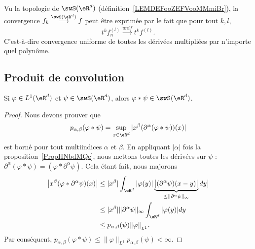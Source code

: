 \begin{remark}
    Vu la topologie de \( \swS(\eR^d)\) (définition~\ref{LEMDEFooZEFVooMMmiBr}), la convergence \( f_k\stackrel{\swS(\eR^d)}{\longrightarrow}f\) peut être exprimée par le fait que pour tout \( k,l\),
    \begin{equation}
        t^kf_n^{(l)}\stackrel{unif}{\longrightarrow}t^kf^{(l)}.
    \end{equation}
    C'est-à-dire convergence uniforme de toutes les dérivées multipliées par n'importe quel polynôme.
\end{remark}

\subsection{Produit de convolution}

\begin{proposition}     \label{PROPooUNFYooYdbSbJ}
    Si \( \varphi\in L^1(\eR^d)\) et \( \psi\in\swS(\eR^d)\), alors \( \varphi * \psi\in \swS(\eR^d)\).
\end{proposition}

\begin{proof}
    Nous devons prouver que
    \begin{equation}
        p_{\alpha,\beta}(\varphi*\psi)=\sup_{x\in \eR^d}| x^{\beta}(\partial^{\alpha}(\varphi*\psi))(x) |
    \end{equation}
    est borné pour tout multiindices \( \alpha\) et \( \beta\). En appliquant \( | \alpha |\) fois la proposition~\ref{PropHNbdMQe}, nous mettons toutes les dérivées sur \( \psi\) : \( \partial^{\alpha}(\varphi*\psi)=(\varphi*\partial^{\alpha}\psi)\). Cela étant fait, nous majorons
    \begin{subequations}
        \begin{align}
            \big| x^{\beta}(\varphi*\partial^{\alpha}\psi)(x) \big|&\leq| x^{\beta} |\int_{\eR^d} |\varphi(y)|\underbrace{\big| (\partial^{\alpha}\psi)(x-y)\big|}_{\leq\| \partial^{\alpha}\psi \|_{\infty}} dy \big|\\
            &\leq | x^{\beta} |  \| \partial^{\alpha}\psi \|_{\infty}\int_{\eR^d}| \varphi(y) |dy\\
            &\leq p_{\alpha,\beta}(\psi)\| \varphi \|_{_{L^1}}.
        \end{align}
    \end{subequations}
    Par conséquent, \( p_{\alpha,\beta}(\varphi*\psi)\leq \| \varphi \|_{L^1}p_{\alpha,\beta}(\psi)<\infty\).
\end{proof}

